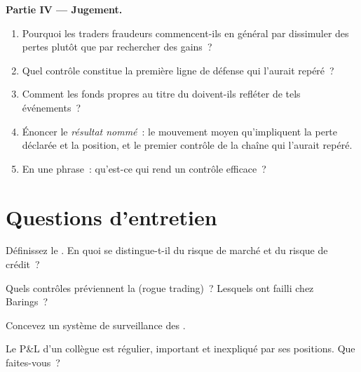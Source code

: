 \begin{problem}
\medskip\noindent\textbf{Partie IV --- Jugement.}
\begin{enumerate}[resume]
\item Pourquoi les traders fraudeurs commencent-ils en général par dissimuler des pertes plutôt que par rechercher des gains~?
\item Quel contrôle constitue la première ligne de défense qui l'aurait repéré~?
\item Comment les fonds propres au titre du  doivent-ils refléter de tels événements~?
\item Énoncer le \emph{résultat nommé}~: le mouvement moyen qu'impliquent la perte déclarée et la position, et le
premier contrôle de la chaîne qui l'aurait repéré.
\item En une phrase~: qu'est-ce qui rend un contrôle efficace~?
\end{enumerate}
\end{problem}

\section{Questions d'entretien}

\begin{interviewq}\label{iq:rc:operational-risk-and-rogue-trading:1}
Définissez le . En quoi se distingue-t-il du risque de marché et du risque de crédit~?
\end{interviewq}

\begin{interviewq}\label{iq:rc:operational-risk-and-rogue-trading:2}
Quels contrôles préviennent la  (rogue trading)~? Lesquels ont failli chez Barings~?
\end{interviewq}

\begin{interviewq}\label{iq:rc:operational-risk-and-rogue-trading:3}
Concevez un système de surveillance des .
\end{interviewq}

\begin{interviewq}\label{iq:rc:operational-risk-and-rogue-trading:4}
Le P\&L d'un collègue est régulier, important et inexpliqué par ses positions. Que faites-vous~?
\end{interviewq}

